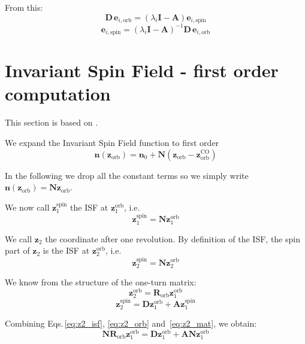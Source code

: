 From this:
\begin{equation}
\mathbf{D} \, \bm{e}_{i, \text{orb}}  = \left(\lambda_i \bm{I} - \mathbf{A} \right) \bm{e}_{i, \text{spin}}
\end{equation}
\begin{equation}
\bm{e}_{i, \text{spin}} = \left(\lambda_i \bm{I} - \mathbf{A} \right)^{-1}\mathbf{D} \, \bm{e}_{i, \text{orb}}
\end{equation}

\section{Invariant Spin Field - first order computation}

This section is based on \cite{Chao:1980fz}.

We expand the Invariant Spin Field \cite{hoffstaetter2006high} function to first order
\begin{equation}
\bm{n}(\bm{z}_{\text{orb}}) = \bm{n}_0
+ \mathbf{N} \left(\bm{z}_{\text{orb}} - \bm{z}_{\text{orb}}^\text{CO} \right)
\end{equation}

In the following we drop all the constant terms so we simply write
$\bm{n}(\bm{z}_{\text{orb}}) = \mathbf{N} \bm{z}_{\text{orb}}$.

We now call $\bm{z}_1^{\text{spin}}$ the ISF at $\bm{z}_1^{\text{orb}}$, i.e.
\begin{equation}
\bm{z}_1^{\text{spin}} = \mathbf{N} \bm{z}_1^{\text{orb}}
\end{equation}

We call $\bm{z}_2$ the coordinate after one revolution. By definition of the ISF, the spin part of $\bm{z}_2$ is the ISF at $\bm{z}_2^{\text{orb}}$, i.e.
\begin{equation}
\bm{z}_2^{\text{spin}} = \mathbf{N} \bm{z}_2^{\text{orb}}
\label{eq:z2_isf}
\end{equation}

We know from the structure of the one-turn matrix:
\begin{equation}
\bm{z}_2^{\text{orb}}  = \mathbf{R}_{\text{orb}} \bm{z}_1^{\text{orb}}
\label{eq:z2_orb}
\end{equation}
\begin{equation}
\bm{z}_2^{\text{spin}} = \mathbf{D} \bm{z}_1^{\text{orb}} + \mathbf{A} \bm{z}_1^{\text{spin}}
\label{eq:z2_mat}
\end{equation}

Combining Eqs.\,\ref{eq:z2_isf}, \ref{eq:z2_orb} and~\ref{eq:z2_mat}, we obtain:
\begin{equation}
\mathbf{N} \mathbf{R}_{\text{orb}} \bm{z}_1^{\text{orb}} = \mathbf{D} \bm{z}_1^{\text{orb}} + \mathbf{A} \mathbf{N} \bm{z}_1^{\text{orb}}
\end{equation}

